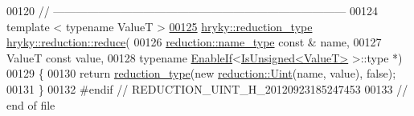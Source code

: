 \begin{DoxyCode}
00120 \textcolor{comment}{//
      ------------------------------------------------------------------------------}
00124 \textcolor{comment}{}\textcolor{keyword}{template} < \textcolor{keyword}{typename} ValueT >
\hypertarget{reduction__uint_8h_source_l00125}{}\hyperlink{namespacehryky_1_1reduction_a1caab12addb28a07707b69d6f19e26fd}{00125} \hyperlink{classhryky_1_1_intrusive_ptr}{hryky::reduction_type} \hyperlink{namespacehryky_1_1reduction_a064022926c530d18aeb1b2abdf71800b}{hryky::reduction::reduce}(
00126     \hyperlink{classhryky_1_1reduction_1_1_string}{reduction::name_type} \textcolor{keyword}{const} & name,
00127     ValueT \textcolor{keyword}{const} value,
00128     \textcolor{keyword}{typename} \hyperlink{classhryky_1_1_enable_if}{EnableIf}<\hyperlink{classhryky_1_1_is_unsigned}{IsUnsigned<ValueT>} >::type *)
00129 \{
00130     \textcolor{keywordflow}{return} \hyperlink{namespacehryky_a343a9a4c36a586be5c2693156200eadc}{reduction_type}(\textcolor{keyword}{new} \hyperlink{classhryky_1_1reduction_1_1_uint}{reduction::Uint}(name, value), \textcolor{keyword}{false});
00131 \}
00132 \textcolor{preprocessor}{#endif // REDUCTION\_UINT\_H\_20120923185247453}
00133 \textcolor{preprocessor}{}\textcolor{comment}{// end of file}
\end{DoxyCode}
